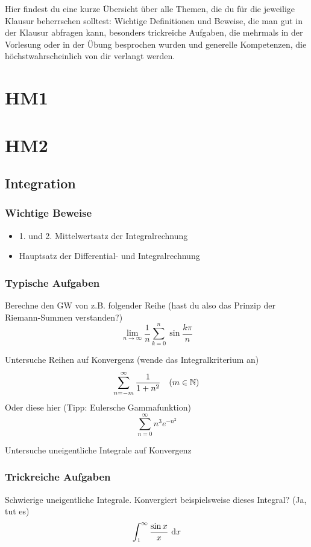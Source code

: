 Hier findest du eine kurze Übersicht über alle Themen, die du für die jeweilige
Klausur beherrschen solltest:
Wichtige Definitionen und Beweise, die man gut in der Klausur abfragen kann,
besonders trickreiche Aufgaben, die mehrmals in der Vorlesung oder in der Übung
besprochen wurden und generelle Kompetenzen, die höchstwahrscheinlich von dir
verlangt werden.
\chapter{HM1}
\chapter{HM2}
\section{Integration}

\subsection{Wichtige Beweise}
\begin{itemize}
  \item 1. und 2. Mittelwertsatz der Integralrechnung
  \item Hauptsatz der Differential- und Integralrechnung
\end{itemize}

\subsection{Typische Aufgaben}
Berechne den GW von z.B. folgender Reihe (hast du also das Prinzip der Riemann-Summen verstanden?)
\begin{equation*}
    \lim\limits_{n \rightarrow \infty}{\frac{1}{n}\sum_{k=0}^n \sin{\frac{k\pi}{n}}}
\end{equation*}

Untersuche Reihen auf Konvergenz (wende das Integralkriterium an)
\begin{equation*}
    \sum_{n=-m}^\infty \frac{1}{1+n^2} \quad (m \in \mathbb{N})
\end{equation*}
Oder diese hier (Tipp: Eulersche Gammafunktion)
\begin{equation}
    \sum_{n=0}^\infty n^3 e^{-n^2}
\end{equation}

Untersuche uneigentliche Integrale auf Konvergenz

\subsection{Trickreiche Aufgaben}
Schwierige uneigentliche Integrale. Konvergiert beispielsweise dieses Integral? (Ja, tut es)
\begin{equation*}
    \int_1^\infty \frac{\sin{x}}{x}\text{ d}x
\end{equation*}

